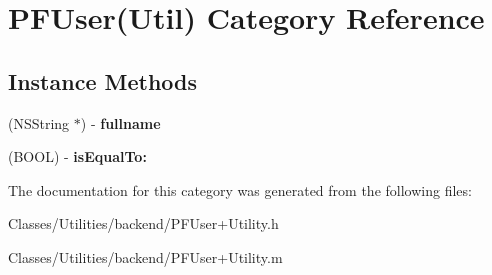 \hypertarget{category_p_f_user_07_util_08}{}\section{P\+F\+User(Util) Category Reference}
\label{category_p_f_user_07_util_08}
\subsection*{Instance Methods}
\begin{DoxyCompactItemize}
\item 
\hypertarget{category_p_f_user_07_util_08_abd5edfe7b8309af67196c7e1be56b0d4}{}(N\+S\+String $\ast$) -\/ {\bfseries fullname}\label{category_p_f_user_07_util_08_abd5edfe7b8309af67196c7e1be56b0d4}

\item 
\hypertarget{category_p_f_user_07_util_08_adca303a55a288f35cfdd7617256a65d8}{}(B\+O\+O\+L) -\/ {\bfseries is\+Equal\+To\+:}\label{category_p_f_user_07_util_08_adca303a55a288f35cfdd7617256a65d8}

\end{DoxyCompactItemize}


The documentation for this category was generated from the following files\+:\begin{DoxyCompactItemize}
\item 
Classes/\+Utilities/backend/P\+F\+User+\+Utility.\+h\item 
Classes/\+Utilities/backend/P\+F\+User+\+Utility.\+m\end{DoxyCompactItemize}
